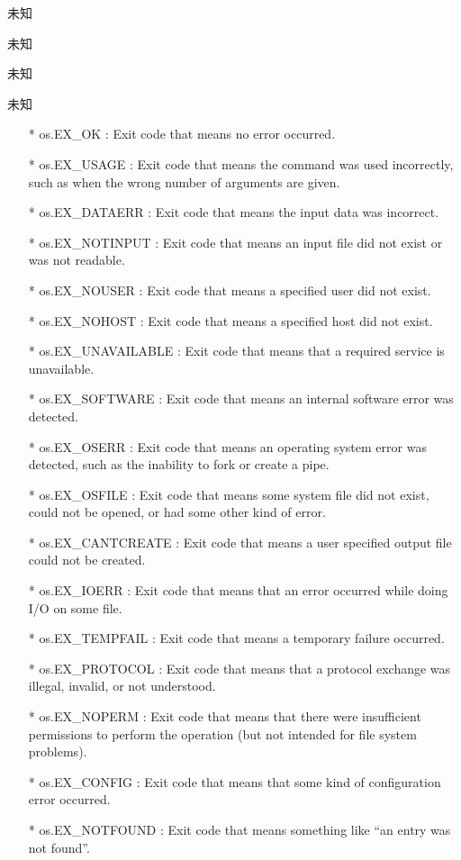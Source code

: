 \noindent{\color{red}{os.execve(path, args, env):}}
\par{未知}\\

\noindent{\color{red}{os.execvp(file, args):}}
\par{未知}\\

\noindent{\color{red}{os.execvpe(file, args, env):}}
\par{未知}\\

\noindent{\color{red}{os.\_exit(n):}}
\par{未知}\\
\begin{itemize}
\item[*]{os.EX\_OK : Exit code that means no error occurred.}
\item[*]{os.EX\_USAGE : Exit code that means the command was used incorrectly, such as when the
wrong number of arguments are given.}
\item[*]{os.EX\_DATAERR : Exit code that means the input data was incorrect.}
\item[*]{os.EX\_NOTINPUT : Exit code that means an input file did not exist or was not readable.}
\item[*]{os.EX\_NOUSER : Exit code that means a specified user did not exist.}
\item[*]{os.EX\_NOHOST : Exit code that means a specified host did not exist.}
\item[*]{os.EX\_UNAVAILABLE : Exit code that means that a required service is unavailable.}
\item[*]{os.EX\_SOFTWARE : Exit code that means an internal software error was detected.}
\item[*]{os.EX\_OSERR : Exit code that means an operating system error was detected, such as the
inability to fork or create a pipe.}
\item[*]{os.EX\_OSFILE : Exit code that means some system file did not exist, could not be opened,
or had some other kind of error.}
\item[*]{os.EX\_CANTCREATE : Exit code that means a user specified output file could not be
created.}
\item[*]{os.EX\_IOERR : Exit code that means that an error occurred while doing I/O on some file.}
\item[*]{os.EX\_TEMPFAIL : Exit code that means a temporary failure occurred.}
\item[*]{os.EX\_PROTOCOL : Exit code that means that a protocol exchange was illegal, invalid, or
not understood.}
\item[*]{os.EX\_NOPERM : Exit code that means that there were insufficient permissions to perform
the operation (but not intended for file system problems).}
\item[*]{os.EX\_CONFIG : Exit code that means that some kind of configuration error occurred.}
\item[*]{os.EX\_NOTFOUND : Exit code that means something like \textquotedblleft{an entry was not found}\textquotedblright{}.}
\end{itemize}


